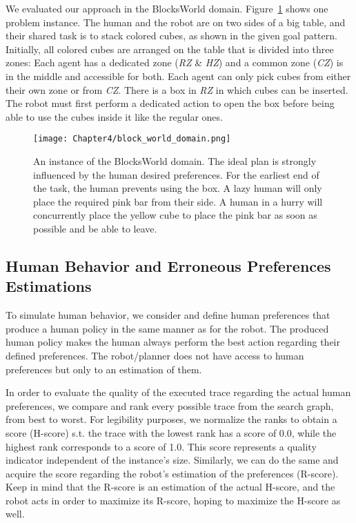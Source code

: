 We evaluated our approach in the BlocksWorld domain. Figure~\ref{fig:block_world_domain} shows one problem instance. 
The human and the robot are on two sides of a big table, and their shared task is to stack colored cubes, as shown in the given goal pattern. 
Initially, all colored cubes are arranged on the table that is divided into three zones: Each agent has a dedicated zone (\textit{RZ} \& \textit{HZ}) and a common zone (\textit{CZ}) is in the middle and accessible for both. 
Each agent can only pick cubes from either their own zone or from \textit{CZ}. 
There is a box in \textit{RZ} in which cubes can be inserted. The robot must first perform a dedicated action to open the box before being able to use the cubes inside it like the regular ones.


\begin{figure}
    \centering
    \texttt{[image: Chapter4/block\_world\_domain.png]}
    \caption{An instance of the BlocksWorld domain. The ideal plan is strongly influenced by the human desired preferences. For the earliest end of the task, the human prevents using the box. A lazy human will only place the required pink bar from their side. A human in a hurry will concurrently place the yellow cube to place the pink bar as soon as possible and be able to leave.}
    \label{fig:block_world_domain}
\end{figure}


    \subsection{Human Behavior and Erroneous Preferences Estimations}

To simulate human behavior, we consider and define human preferences that produce a human policy in the same manner as for the robot. The produced human policy makes the human always perform the best action regarding their defined preferences. The robot/planner does not have access to human preferences but only to an estimation of them.

In order to evaluate the quality of the executed trace regarding the actual human preferences, we compare and rank every possible trace from the search graph, from best to worst. For legibility purposes, we normalize the ranks to obtain a score (H-score) s.t. the trace with the lowest rank has a score of 0.0, while the highest rank corresponds to a score of 1.0. This score represents a quality indicator independent of the instance's size. 
Similarly, we can do the same and acquire the score regarding the robot's estimation of the preferences (R-score). 
Keep in mind that the R-score is an estimation of the actual H-score, and the robot acts in order to maximize its R-score, hoping to maximize the H-score as well.

